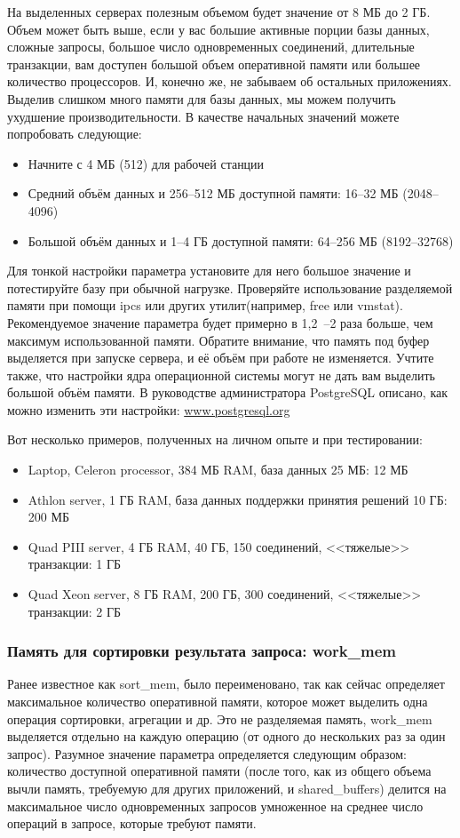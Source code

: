 На выделенных серверах полезным объемом будет значение от 8 МБ до 2 ГБ. 
Объем может быть выше, если у вас большие активные порции базы данных, сложные запросы, большое число 
одновременных соединений, длительные транзакции, вам доступен большой объем оперативной памяти или большее количество 
процессоров. И, конечно же, не забываем об остальных приложениях. Выделив слишком много памяти для базы данных, 
мы можем получить ухудшение производительности. 
В качестве начальных значений можете попробовать следующие:
\begin{itemize}
\item Начните с 4 МБ (512) для рабочей станции
\item Средний объём данных и 256--512 МБ доступной памяти: 16--32 МБ (2048--4096)
\item Большой объём данных и 1--4 ГБ доступной памяти: 64--256 МБ (8192--32768)
\end{itemize}

Для тонкой настройки параметра установите для него большое значение и потестируйте базу при обычной нагрузке. 
Проверяйте использование разделяемой памяти при помощи ipcs или других утилит(например, free или vmstat). 
Рекомендуемое значение параметра 
будет примерно в 1,2~--2 раза больше, чем максимум использованной памяти. Обратите внимание, что память под буфер 
выделяется при запуске сервера, и её объём при работе не изменяется. Учтите также, что настройки ядра операционной 
системы могут не дать вам выделить большой объём памяти. В руководстве администратора PostgreSQL описано, как 
можно изменить эти настройки: \href{http://www.postgresql.org/docs/devel/static/kernel-resources.html}{www.postgresql.org}

Вот несколько примеров, полученных на личном опыте и при тестировании:
\begin{itemize}
\item Laptop, Celeron processor, 384 МБ RAM, база данных 25 МБ: 12 МБ
\item Athlon server, 1 ГБ RAM, база данных поддержки принятия решений 10 ГБ: 200 МБ
\item Quad PIII server, 4 ГБ RAM, 40 ГБ, 150 соединений, <<тяжелые>> транзакции: 1 ГБ
\item Quad Xeon server, 8 ГБ RAM, 200 ГБ, 300 соединений, <<тяжелые>> транзакции: 2 ГБ
\end{itemize}

\subsubsection{Память для сортировки результата запроса: work\_mem}
Ранее известное как sort\_mem, было переименовано, так как сейчас определяет максимальное количество оперативной памяти, 
которое может выделить одна операция сортировки, агрегации и др. Это не разделяемая память, work\_mem выделяется отдельно 
на каждую операцию (от одного до нескольких раз за один запрос). Разумное значение параметра определяется следующим образом: 
количество доступной оперативной памяти (после того, как из общего объема вычли память, требуемую для других приложений, и 
shared\_buffers) делится на максимальное число одновременных запросов умноженное на среднее число операций в запросе, которые 
требуют памяти.

